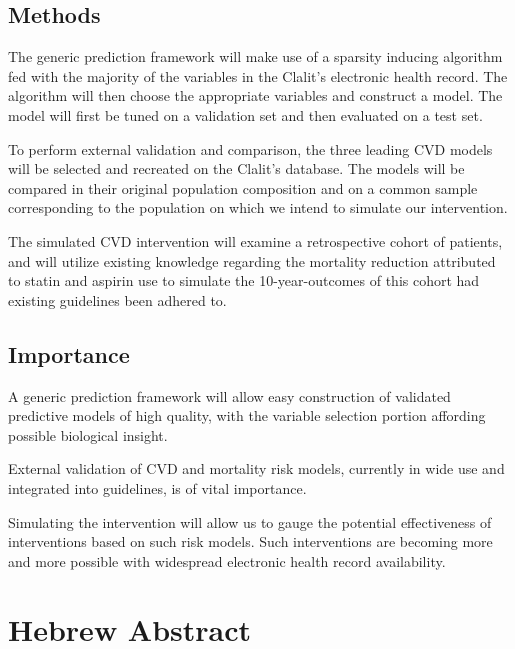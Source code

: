 \documentclass[a4paper,12pt]{article}
\begin{document}
		\subsection{Methods}
		The generic prediction framework will make use of a sparsity inducing algorithm fed with the majority of the variables in the Clalit's electronic health record. The algorithm will then choose the appropriate variables and construct a model. The model will first be tuned on a validation set and then evaluated on a test set.
		
		To perform external validation and comparison, the three leading CVD models will be selected and recreated on the Clalit's database. The models will be compared in their original population composition and on a common sample corresponding to the population on which we intend to simulate our intervention.
		
		The simulated CVD intervention will examine a retrospective cohort of patients, and will utilize existing knowledge regarding the mortality reduction attributed to statin and aspirin use to simulate the 10-year-outcomes of this cohort had existing guidelines been adhered to.
		
		\subsection{Importance}
		A generic prediction framework will allow easy construction of validated predictive models of high quality, with the variable selection portion affording possible biological insight.
		
		External validation of CVD and mortality risk models, currently in wide use and integrated into guidelines, is of vital importance\cite{Moons2012}.
		
		Simulating  the intervention will allow us to gauge the potential effectiveness of interventions based on such risk models. Such interventions are becoming more and more possible with widespread electronic health record availability.
		
	\section{Hebrew Abstract}
	
\end{document}
